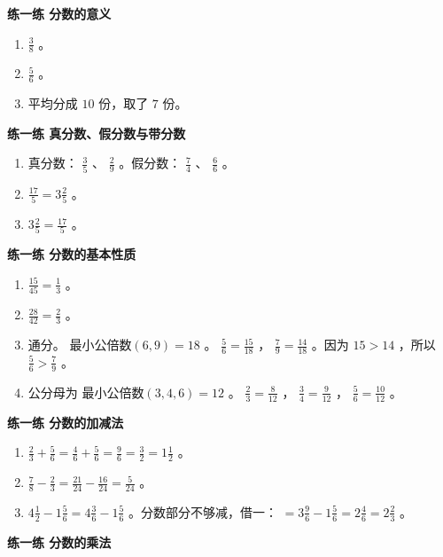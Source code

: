 \begin{answer}


\textbf{练一练 分数的意义}

\begin{enumerate}
  \item $\frac{3}{8}$ 。
  \item $\frac{5}{6}$ 。
  \item 平均分成 $10$ 份，取了 $7$ 份。
\end{enumerate}


\textbf{练一练 真分数、假分数与带分数}

\begin{enumerate}
  \item 真分数： $\frac{3}{5}$ 、 $\frac{2}{9}$ 。假分数： $\frac{7}{4}$ 、 $\frac{6}{6}$ 。
  \item $\frac{17}{5} = 3\frac{2}{5}$ 。
  \item $3\frac{2}{5} = \frac{17}{5}$ 。
\end{enumerate}


\textbf{练一练 分数的基本性质}

\begin{enumerate}
  \item $\frac{15}{45} = \frac{1}{3}$ 。
  \item $\frac{28}{42} = \frac{2}{3}$ 。
  \item 通分。 $\text{最小公倍数}(6, 9) = 18$ 。 $\frac{5}{6} = \frac{15}{18}$ ， $\frac{7}{9} = \frac{14}{18}$ 。因为 $15 > 14$ ，所以 $\frac{5}{6} > \frac{7}{9}$ 。
  \item 公分母为 $\text{最小公倍数}(3, 4, 6) = 12$ 。 $\frac{2}{3} = \frac{8}{12}$ ， $\frac{3}{4} = \frac{9}{12}$ ， $\frac{5}{6} = \frac{10}{12}$ 。
\end{enumerate}


\textbf{练一练 分数的加减法}

\begin{enumerate}
  \item $\frac{2}{3} + \frac{5}{6} = \frac{4}{6} + \frac{5}{6} = \frac{9}{6} = \frac{3}{2} = 1\frac{1}{2}$ 。
  \item $\frac{7}{8} - \frac{2}{3} = \frac{21}{24} - \frac{16}{24} = \frac{5}{24}$ 。
  \item $4\frac{1}{2} - 1\frac{5}{6} = 4\frac{3}{6} - 1\frac{5}{6}$ 。分数部分不够减，借一： $= 3\frac{9}{6} - 1\frac{5}{6} = 2\frac{4}{6} = 2\frac{2}{3}$ 。
\end{enumerate}


\textbf{练一练 分数的乘法}


\end{answer}
